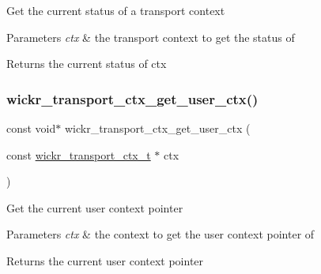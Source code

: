 Get the current status of a transport context


\begin{DoxyParams}{Parameters}
{\em ctx} & the transport context to get the status of \\
\hline
\end{DoxyParams}
\begin{DoxyReturn}{Returns}
the current status of \textquotesingle{}ctx\textquotesingle{} 
\end{DoxyReturn}
\mbox{\label{group__wickr__transport__ctx_gaea14ff3de739f7bf4f85516fdefd1ea9}} 
\subsubsection{\texorpdfstring{wickr\+\_\+transport\+\_\+ctx\+\_\+get\+\_\+user\+\_\+ctx()}{wickr\_transport\_ctx\_get\_user\_ctx()}}
{\footnotesize\ttfamily const void$\ast$ wickr\+\_\+transport\+\_\+ctx\+\_\+get\+\_\+user\+\_\+ctx (\begin{DoxyParamCaption}\item[{const \hyperlink{structwickr__transport__ctx}{wickr\+\_\+transport\+\_\+ctx\+\_\+t} $\ast$}]{ctx }\end{DoxyParamCaption})}

Get the current user context pointer


\begin{DoxyParams}{Parameters}
{\em ctx} & the context to get the user context pointer of \\
\hline
\end{DoxyParams}
\begin{DoxyReturn}{Returns}
the current user context pointer 
\end{DoxyReturn}
\mbox{\label{group__wickr__transport__ctx_gad982fd3463a81a667592e18d7bf90822}} 
